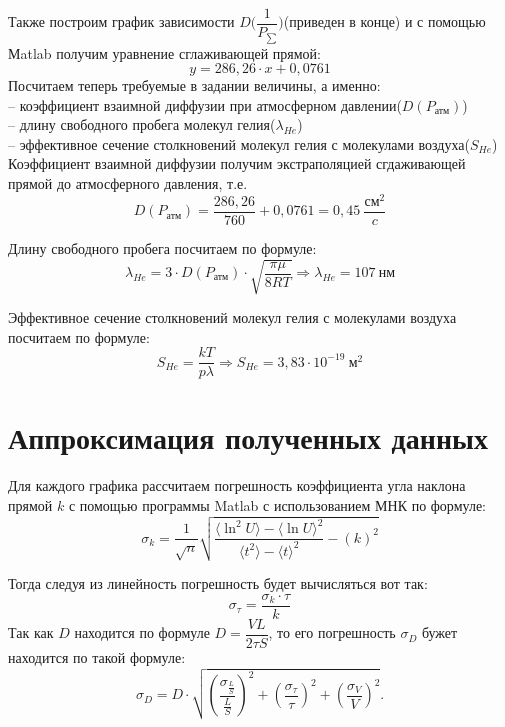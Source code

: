 Также построим график зависимости $D\bigg(\dfrac{1}{P_{\sum}}\bigg)$(приведен в конце) и с помощью Мatlab получим уравнение сглаживающей прямой:
\begin{equation}
	y = 286,26\cdot x + 0,0761
\end{equation}
Посчитаем теперь требуемые в задании величины, а именно:\\
	-- коэффициент взаимной диффузии при атмосферном давлении($D(P_{\text{атм}})$) \\
	-- длину свободного пробега молекул гелия($\lambda_{He}$)\\
	-- эффективное сечение столкновений молекул гелия с молекулами воздуха($S_{He}$)\\
	
Коэффициент взаимной диффузии получим экстраполяцией сгдаживающей прямой до атмосферного давления, т.е.
\begin{equation}
	D(P_{\text{атм}}) = \frac{286,26}{760} + 0,0761 = 0,45\ \frac{\text{см}^2}{c}
\end{equation}

Длину свободного пробега посчитаем по формуле:
\begin{equation}
	\lambda_{He} = 3\cdot D(P_{\text{атм}})\cdot \sqrt{\dfrac{\pi \mu}{8RT}} \Rightarrow  \lambda_{He} = 107\ \text{нм}
\end{equation}

Эффективное сечение столкновений молекул гелия с молекулами воздуха посчитаем по формуле:
\begin{equation}
	S_{He} = \frac{kT}{p\lambda} \Rightarrow S_{He} = 3,83 \cdot 10^{-19}\ \text{м}^2
\end{equation}


\section{Аппроксимация полученных данных}

Для каждого графика рассчитаем погрешность коэффициента угла наклона прямой $k$ с помощью программы  Matlab с использованием МНК по формуле:
\begin{equation}
	\sigma_k = \dfrac{1}{\sqrt{n}} \sqrt{\dfrac{\langle\ln^2 U\rangle - \langle\ln U\rangle^2}{\langle t^2\rangle - \langle t\rangle^2} - \left(k\right)^2}  
\end{equation}

Тогда следуя из линейность погрешность будет вычисляться вот так:
\begin{equation}
	\sigma_\tau = \dfrac{\sigma_k\cdot \tau}{k}
\end{equation}
Так как $D$ находится по формуле $D = \dfrac{VL}{2 \tau S}$, то его погрешность $\sigma_D$ бужет находится по такой формуле:
\begin{equation}
	\sigma_D = D \cdot \sqrt{\left(\dfrac{\sigma_{\frac{L}{S}}}{\frac{L}{S}}\right)^2 + \left(\dfrac{\sigma_{\tau}}{\tau}\right)^2 + \left(\dfrac{\sigma_V}{V}\right)^2}.
\end{equation}

